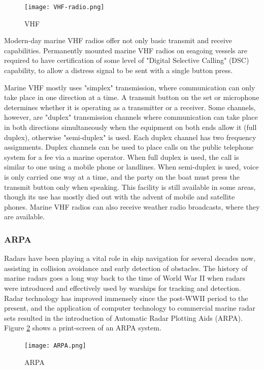 \begin{figure}[H]
	\centering
	\texttt{[image: VHF-radio.png]}
	\caption{\acf{VHF}}
	\label{fig:vhf-radio}
\end{figure}

\newpage

Modern-day marine VHF radios offer not only basic transmit and receive capabilities. Permanently mounted marine VHF radios on seagoing vessels are required to have certification of some level of "Digital Selective Calling" (DSC) capability, to allow a distress signal to be sent with a single button press.

Marine VHF mostly uses "simplex" transmission, where communication can only take place in one direction at a time. A transmit button on the set or microphone determines whether it is operating as a transmitter or a receiver. Some channels, however, are "duplex" transmission channels where communication can take place in both directions simultaneously when the equipment on both ends allow it (full duplex), otherwise "semi-duplex" is used. Each duplex channel has two frequency assignments. Duplex channels can be used to place calls on the public telephone system for a fee via a marine operator. When full duplex is used, the call is similar to one using a mobile phone or landlines. When semi-duplex is used, voice is only carried one way at a time, and the party on the boat must press the transmit button only when speaking. This facility is still available in some areas, though its use has mostly died out with the advent of mobile and satellite phones. Marine VHF radios can also receive weather radio broadcasts, where they are available.

\subsubsection{\acf{ARPA}}
Radars have been playing a vital role in ship navigation for several decades now, assisting in collision avoidance and early detection of obstacles. The history of marine radars goes a long way back to the time of World War II when radars were introduced and effectively used by warships for tracking and detection. Radar technology has improved immensely since the post-WWII period to the present, and the application of computer technology to commercial marine radar sets resulted in the introduction of Automatic Radar Plotting Aids (ARPA). Figure \ref{fig:ARPA} shows a print-screen of an ARPA system.

\begin{figure}[htp]
	\centering
	\texttt{[image: ARPA.png]}
	\caption{\acf{ARPA}}
	\label{fig:ARPA}
\end{figure}

